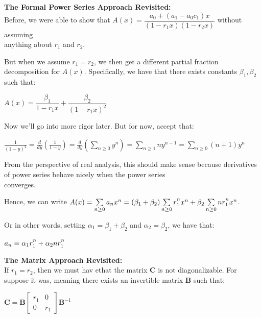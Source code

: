 \documentclass{book}
\newcommand{\hTwo}{%
\color{MidnightBlue}%
   \fontsize{13}{15}\selectfont%
}
\newcommand{\myComment}{%
   \color{RawerSienna}%
   \fontsize{12}{14}\selectfont%
}
\newenvironment{myIndent}{%
   \begin{adjustwidth}{2.5em}{0em}%
}{%
   \end{adjustwidth}%
}
\newenvironment{myTindent}{%
   \begin{adjustwidth}{7.5em}{0em}%
}{%
   \end{adjustwidth}%
}
\newcommand{\blab}[1]{\textbf{#1}}
\newcommand{\retTwo}{\hfill\bigbreak}
\begin{document}
\begin{myIndent}\hTwo
   \blab{The Formal Power Series Approach Revisited:}\\
   Before, we were able to show that $A(x) = \dfrac{a_0 + (a_1 - a_0c_1)x}{(1 - r_1x)(1 - r_2x)}$ without assuming\\ [-7pt] anything about $r_1$ and $r_2$.\newpage

   But when we assume $r_1 = r_2$, we then get a different partial fraction decomposition for $A(x)$. Specifically, we have that there exists constants $\beta_1, \beta_2$ such that:

   {\centering $A(x) = \dfrac{\beta_1}{1 - r_1x} + \dfrac{\beta_2}{(1 - r_1x)^2} $ \retTwo\par}

   Now we'll go into more rigor later. But for now, accept that:

   {\centering $\frac{1}{(1 - y)^2} = \frac{d}{dy}\left(\frac{1}{1 - y}\right) = \frac{d}{dy}\left(\sum\limits_{n\geq 0}y^n\right) = \sum\limits_{n \geq 1}ny^{n-1} = \sum\limits_{n \geq 0}(n+1)y^n$\par}

   
   \begin{myTindent}\myComment
      From the perspective of real analysis, this should make sense because derivatives of power series behave nicely when the power series\\ converges.\retTwo
   \end{myTindent}

   Hence, we can write $A(x) = \sum\limits_{n \geq 0}a_n x^n = (\beta_1 + \beta_2) \sum\limits_{n \geq 0}r_1^{\vphantom{|}n}x^n + \beta_2 \sum\limits_{n \geq 0}nr_1^{\vphantom{|}n}x^n$.\retTwo

   Or in other words, setting $\alpha_1 = \beta_1 + \beta_2$ and $\alpha_2 = \beta_2$, we have that:

   {\centering $a_n = \alpha_1r_1^{\vphantom{|}n} + \alpha_2 n r_1^{\vphantom{|}n}$\\ [20pt]\par}

   \blab{The Matrix Approach Revisited:}\\

   If $r_1 = r_2$, then we must hav ethat the matrix $\bm{C}$ is not diagonalizable. For suppose it was, meaning there exists an invertible matrix $\bm{B}$ such that:
   
   {\centering$\bm{C} = \bm{B}
   \begin{bmatrix}
      r_1 & 0\\ 0 & r_1
   \end{bmatrix}\bm{B}^{-1}$\retTwo\par}


\end{myIndent}
\end{document}
